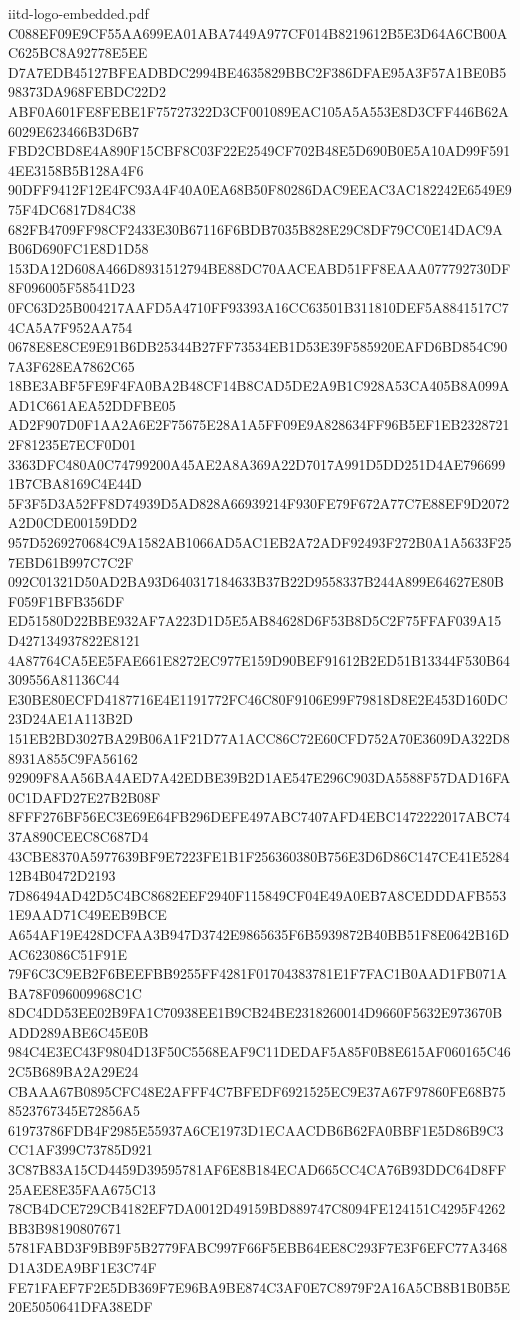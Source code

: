 \begin{filecontents*}[overwrite]{iitd-logo-embedded.pdf}
C088EF09E9CF55AA699EA01ABA7449A977CF014B8219612B5E3D64A6CB00AC625BC8A92778E5EE
D7A7EDB45127BFEADBDC2994BE4635829BBC2F386DFAE95A3F57A1BE0B598373DA968FEBDC22D2
ABF0A601FE8FEBE1F75727322D3CF001089EAC105A5A553E8D3CFF446B62A6029E623466B3D6B7
FBD2CBD8E4A890F15CBF8C03F22E2549CF702B48E5D690B0E5A10AD99F5914EE3158B5B128A4F6
90DFF9412F12E4FC93A4F40A0EA68B50F80286DAC9EEAC3AC182242E6549E975F4DC6817D84C38
682FB4709FF98CF2433E30B67116F6BDB7035B828E29C8DF79CC0E14DAC9AB06D690FC1E8D1D58
153DA12D608A466D8931512794BE88DC70AACEABD51FF8EAAA077792730DF8F096005F58541D23
0FC63D25B004217AAFD5A4710FF93393A16CC63501B311810DEF5A8841517C74CA5A7F952AA754
0678E8E8CE9E91B6DB25344B27FF73534EB1D53E39F585920EAFD6BD854C907A3F628EA7862C65
18BE3ABF5FE9F4FA0BA2B48CF14B8CAD5DE2A9B1C928A53CA405B8A099AAD1C661AEA52DDFBE05
AD2F907D0F1AA2A6E2F75675E28A1A5FF09E9A828634FF96B5EF1EB23287212F81235E7ECF0D01
3363DFC480A0C74799200A45AE2A8A369A22D7017A991D5DD251D4AE7966991B7CBA8169C4E44D
5F3F5D3A52FF8D74939D5AD828A66939214F930FE79F672A77C7E88EF9D2072A2D0CDE00159DD2
957D5269270684C9A1582AB1066AD5AC1EB2A72ADF92493F272B0A1A5633F257EBD61B997C7C2F
092C01321D50AD2BA93D640317184633B37B22D9558337B244A899E64627E80BF059F1BFB356DF
ED51580D22BBE932AF7A223D1D5E5AB84628D6F53B8D5C2F75FFAF039A15D427134937822E8121
4A87764CA5EE5FAE661E8272EC977E159D90BEF91612B2ED51B13344F530B64309556A81136C44
E30BE80ECFD4187716E4E1191772FC46C80F9106E99F79818D8E2E453D160DC23D24AE1A113B2D
151EB2BD3027BA29B06A1F21D77A1ACC86C72E60CFD752A70E3609DA322D88931A855C9FA56162
92909F8AA56BA4AED7A42EDBE39B2D1AE547E296C903DA5588F57DAD16FA0C1DAFD27E27B2B08F
8FFF276BF56EC3E69E64FB296DEFE497ABC7407AFD4EBC1472222017ABC7437A890CEEC8C687D4
43CBE8370A5977639BF9E7223FE1B1F256360380B756E3D6D86C147CE41E528412B4B0472D2193
7D86494AD42D5C4BC8682EEF2940F115849CF04E49A0EB7A8CEDDDAFB5531E9AAD71C49EEB9BCE
A654AF19E428DCFAA3B947D3742E9865635F6B5939872B40BB51F8E0642B16DAC623086C51F91E
79F6C3C9EB2F6BEEFBB9255FF4281F01704383781E1F7FAC1B0AAD1FB071ABA78F096009968C1C
8DC4DD53EE02B9FA1C70938EE1B9CB24BE2318260014D9660F5632E973670BADD289ABE6C45E0B
984C4E3EC43F9804D13F50C5568EAF9C11DEDAF5A85F0B8E615AF060165C462C5B689BA2A29E24
CBAAA67B0895CFC48E2AFFF4C7BFEDF6921525EC9E37A67F97860FE68B758523767345E72856A5
61973786FDB4F2985E55937A6CE1973D1ECAACDB6B62FA0BBF1E5D86B9C3CC1AF399C73785D921
3C87B83A15CD4459D39595781AF6E8B184ECAD665CC4CA76B93DDC64D8FF25AEE8E35FAA675C13
78CB4DCE729CB4182EF7DA0012D49159BD889747C8094FE124151C4295F4262BB3B98190807671
5781FABD3F9BB9F5B2779FABC997F66F5EBB64EE8C293F7E3F6EFC77A3468D1A3DEA9BF1E3C74F
FE71FAEF7F2E5DB369F7E96BA9BE874C3AF0E7C8979F2A16A5CB8B1B0B5E20E5050641DFA38EDF

\end{filecontents*}
